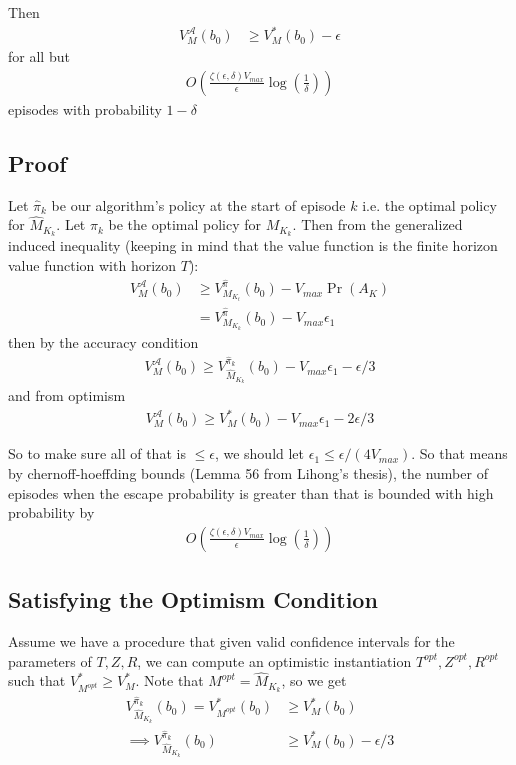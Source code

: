 \documentclass[10pt,english]{article}
\begin{document}
Then
\begin{align}
	V^\mathcal{A}_{M}(b_0) &\geq V^{*}_{M}(b_0) - \epsilon
\end{align}
for all but
\begin{align}
	O\left(\frac{\zeta(\epsilon,\delta)V_{max}}{\epsilon}\log\left(\frac{1}{\delta}\right)\right)
\end{align}
episodes with probability $1-\delta$

\subsection{Proof}

Let $\widehat{\pi}_k$ be our algorithm's policy at the start of episode $k$ i.e. the optimal policy for $\widehat{M}_{K_k}$. Let $\pi_k$ be the optimal policy for $M_{K_k}$. Then from the generalized induced inequality (keeping in mind that the value function is the finite horizon value function with horizon $T$):
\begin{align}
	V^{\mathcal{A}}_M(b_0) &\geq V^{\widehat{\pi}}_{M_{K_t}}(b_0) - V_{max}\Pr(A_K)\\
	&= V^{\widehat{\pi}}_{M_{K_k}}(b_0) - V_{max}\epsilon_1
\end{align}
then by the accuracy condition
\begin{align}
	V^{\mathcal{A}}_M(b_0) \geq V^{\widehat{\pi}_k}_{\widehat{M}_{K_k}}(b_0) - V_{max}\epsilon_1 - \epsilon/3
\end{align}
and from optimism
\begin{align}
	V^{\mathcal{A}}_M(b_0) \geq V^{*}_{M}(b_0) - V_{max}\epsilon_1 - 2\epsilon/3
\end{align}

So to make sure all of that is $\leq \epsilon$, we should let $\epsilon_1 \leq \epsilon/(4V_{max})$. So that means by chernoff-hoeffding bounds (Lemma 56 from Lihong's thesis), the number of episodes when the escape probability is greater than that is bounded with high probability by
\begin{align}
	O\left(\frac{\zeta(\epsilon,\delta)V_{max}}{\epsilon}\log\left(\frac{1}{\delta}\right)\right)
\end{align}

\subsection{Satisfying the Optimism Condition}

Assume we have a procedure that given valid confidence intervals for the parameters of $T,Z,R$, we can compute an optimistic instantiation $T^{opt},Z^{opt},R^{opt}$ such that $V^*_{M^{opt}} \geq V^*_{M}$. Note that $M^{opt} = \widehat{M}_{K_k}$, so we get
\begin{align}
V^{\widehat{\pi}_k}_{\widehat{M}_{K_k}}(b_0) = V^*_{M^{opt}}(b_0) &\geq V^{*}_M(b_0) \\
\implies V^{\widehat{\pi}_k}_{\widehat{M}_{K_k}}(b_0) &\geq V^{*}_M(b_0) - \epsilon/3
\end{align}
\end{document}
